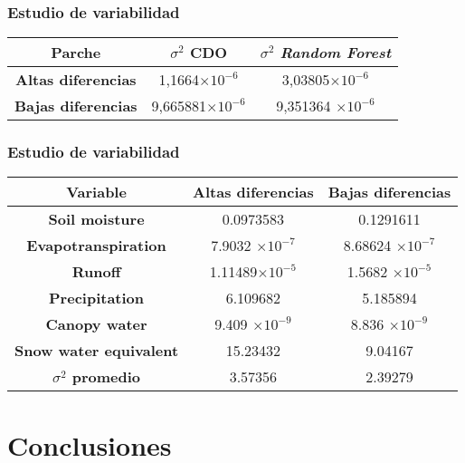 \documentclass{beamer}
\begin{document}
  \begin{frame}
    \frametitle{Estudio de variabilidad}

    \begin{center}
      \begin{tabular}{|c|c|c|}
        \hline
        \textbf{Parche}	& \textbf{$\sigma^2$ CDO}	& \textbf{$\sigma^2$ \textit{Random Forest}} \\
        \hline
        \textbf{Altas diferencias}		& 1,1664$\times 10^{-6}$ &3,03805$\times 10^{-6}$  \\
        \textbf{Bajas diferencias}		 & 9,665881$\times 10^{-6}$ & 9,351364 $\times 10^{-6}$\\
        \hline
      \end{tabular}
    \end{center}
  \end{frame}

  \begin{frame}
    \frametitle{Estudio de variabilidad}
    \centering
    \begin{tabular}{|c|c|c|}
      \hline
      \textbf{Variable}	& \textbf{Altas diferencias}	& \textbf{Bajas diferencias} \\
      \hline
      \textbf{Soil moisture}		         & 0.0973583                  & 0.1291611\\
      \textbf{Evapotranspiration}	       & 7.9032 $\times 10^{-7}$    & 8.68624 $\times 10^{-7}$\\
      \textbf{Runoff}		                 & 1.11489$\times 10^{-5}$    & 1.5682 $\times 10^{-5}$  \\
      \textbf{Precipitation}		         & 6.109682                   & 5.185894\\
      \textbf{Canopy water}		           & 9.409  $\times 10^{-9}$    & 8.836  $\times 10^{-9}$\\
      \textbf{Snow water equivalent}	   & 15.23432                   & 9.04167 \\
      \hline
      \textbf{$\sigma^2$ promedio}         & 3.57356                    & 2.39279\\
      \hline
    \end{tabular}
  \end{frame}

  \section*{Conclusiones}
\end{document}
